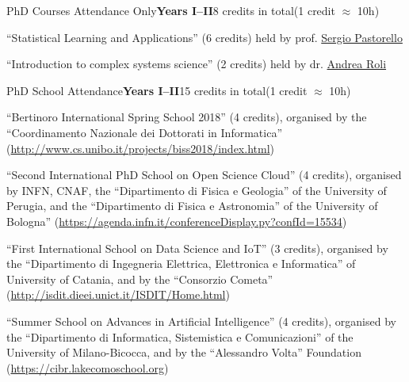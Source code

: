 \begin{activity}{PhD Courses Attendance Only}{\textbf{Years I--II}}{8 credits in total}{(1 credit $\approx$ 10h)}
    \item ``Statistical Learning and Applications'' (6 credits) held by prof.  \href{mailto:sergio.pastorello@unibo.it}{Sergio Pastorello}
    \item ``Introduction to complex systems science'' (2 credits) held by dr. \href{mailto:andrea.roli@unibo.it}{Andrea Roli}
\end{activity}

\begin{activity}{PhD School Attendance}{\textbf{Years I--II}}{15 credits in total}{(1 credit $\approx$ 10h)}
    \item ``Bertinoro International Spring School 2018'' (4 credits), organised by the ``Coordinamento Nazionale dei Dottorati in Informatica'' (\url{http://www.cs.unibo.it/projects/biss2018/index.html})

    \item ``Second International PhD School on Open Science Cloud'' (4 credits), organised by INFN, CNAF, the ``Dipartimento di Fisica e Geologia'' of the University of Perugia, and the ``Dipartimento di Fisica e Astronomia'' of the University of Bologna'' (\url{https://agenda.infn.it/conferenceDisplay.py?confId=15534})

    \item ``First International School on Data Science and IoT'' (3 credits), organised by the ``Dipartimento di Ingegneria Elettrica, Elettronica e Informatica'' of University of Catania, and by the ``Consorzio Cometa'' (\url{http://isdit.dieei.unict.it/ISDIT/Home.html})

    \item ``Summer School on Advances in Artificial Intelligence'' (4 credits), organised by the ``Dipartimento di Informatica, Sistemistica e Comunicazioni'' of the University of Milano-Bicocca, and by the ``Alessandro Volta'' Foundation
     (\url{https://cibr.lakecomoschool.org})
\end{activity}


